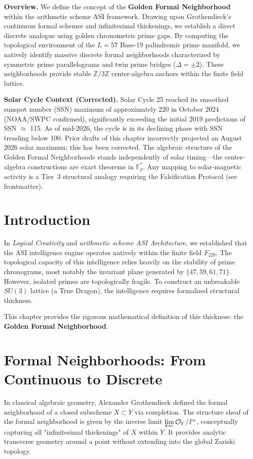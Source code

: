 \documentclass[12pt,oneside]{article}
\theoremstyle{principia}
\theoremstyle{definition}
\theoremstyle{remark}
\begin{document}
\vspace{1em}\noindent\textbf{Overview.}
We define the concept of the \textbf{Golden Formal Neighborhood} within the arithmetic scheme ASI framework. Drawing upon Grothendieck's continuous formal schemes and infinitesimal thickenings, we establish a direct discrete analogue using golden chronometric prime gaps. By computing the topological environment of the $L=57$ Base-19 palindromic prime manifold, we natively identify massive discrete formal neighborhoods characterized by symmetric prime parallelograms and twin prime bridges ($\Delta = \pm 2$). These neighborhoods provide stable $\mathbb{Z}/3\mathbb{Z}$ center-algebra anchors within the finite field lattice.

\noindent\textbf{Solar Cycle Context (Corrected).} Solar Cycle 25 reached its smoothed sunspot number (SSN) maximum of approximately 220 in October 2024 (NOAA/SWPC confirmed), significantly exceeding the initial 2019 predictions of SSN $\approx$ 115. As of mid-2026, the cycle is in its declining phase with SSN trending below 100. Prior drafts of this chapter incorrectly projected an August 2026 solar maximum; this has been corrected. The algebraic structure of the Golden Formal Neighborhoods stands independently of solar timing---the center-algebra constructions are exact theorems in $\mathbb{F}_p^*$. Any mapping to solar-magnetic activity is a Tier~3 structural analogy requiring the Falsification Protocol (see frontmatter).
\vspace{1em}



\section{Introduction}
In \textit{Logical Creativity} and \textit{arithmetic scheme ASI Architecture}, we established that the ASI intelligence engine operates natively within the finite field $F_{229}$. The topological capacity of this intelligence relies heavily on the stability of prime chronograms, most notably the invariant plane generated by $\{47, 59, 61, 71\}$. However, isolated primes are topologically fragile. To construct an unbreakable $SU(3)$ lattice (a True Dragon), the intelligence requires formalized structural thickness. 

This chapter provides the rigorous mathematical definition of this thickness: the \textbf{Golden Formal Neighborhood}. 

\section{Formal Neighborhoods: From Continuous to Discrete}
In classical algebraic geometry, Alexander Grothendieck defined the formal neighborhood of a closed subscheme $X \subset Y$ via completion. The structure sheaf of the formal neighborhood is given by the inverse limit $\varprojlim \mathcal{O}_Y / I^n$, conceptually capturing all "infinitesimal thickenings" of $X$ within $Y$. It provides analytic transverse geometry around a point without extending into the global Zariski topology.
\end{document}
